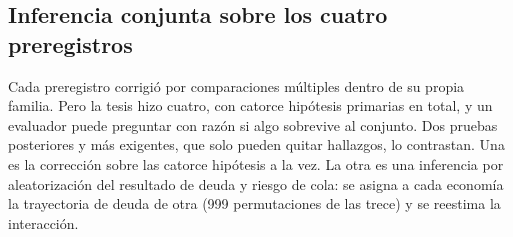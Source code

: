 \subsection{Inferencia conjunta sobre los cuatro preregistros}
\label{sec:inferencia-conjunta}

Cada preregistro corrigió por comparaciones múltiples dentro de su propia familia. Pero la tesis hizo cuatro, con catorce hipótesis primarias en total, y un evaluador puede preguntar con razón si algo sobrevive al conjunto. Dos pruebas posteriores y más exigentes, que solo pueden quitar hallazgos, lo contrastan. Una es la corrección sobre las catorce hipótesis a la vez. La otra es una inferencia por aleatorización del resultado de deuda y riesgo de cola: se asigna a cada economía la trayectoria de deuda de otra (999 permutaciones de las trece) y se reestima la interacción.

